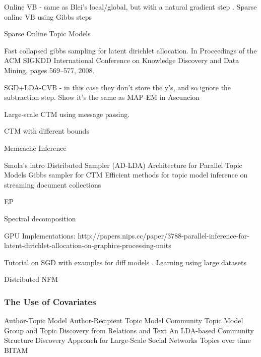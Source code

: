 \documentclass[10pt,fleqn]{article}
\begin{document}

Online VB - same as Blei's local/global, but with a natural gradient step \cite{Hoffman2010}. Sparse online VB using Gibbs steps\cite{Mimno2012a} 

Sparse Online Topic Models\cite{Zhang2013}

Fast collapsed gibbs sampling for latent dirichlet allocation. In Proceedings of the ACM SIGKDD International Conference on Knowledge Discovery and Data Mining, pages 569–577, 2008. 


SGD+LDA-CVB \cite{Boyles2013} - in this case they don't store the y's, and so ignore the subtraction step. Show it's the same as MAP-EM in Ascuncion


Large-scale CTM\cite{Ahmed2006} using message passing.

CTM with different bounds\cite{Wang2013}

Memcache Inference\cite{Ahmed}


Smola's intro \cite{SmolaWeb2012}
Distributed Sampler (AD-LDA)\cite{Newman2009}
Architecture for Parallel Topic Models\cite{Smola2010}
Gibbs sampler for CTM \cite{Chen2013}
Efficient methods for topic model inference on streaming document collections\cite{Yao2009}


EP \cite{Minka2002}

Spectral decomposition \cite{Anandkumar}

GPU Implementations: http://papers.nips.cc/paper/3788-parallel-inference-for-latent-dirichlet-allocation-on-graphics-processing-units

Tutorial on SGD with examples for diff models \cite{Bottou2004}. Learning using large datasets \cite{Bottou2008}

Distributed NFM\cite{Liu2010}



\subsubsection{The Use of Covariates}


Author-Topic Model\cite{RosenZvi2004}
Author-Recipient Topic Model\cite{MacCallum2007}
Community Topic Model\cite{Sachan2012}
Group and Topic Discovery from Relations and Text\cite{Wang2005}
An LDA-based Community Structure Discovery Approach for Large-Scale Social Networks\cite{Zhang2007}
Topics over time\cite{Wang2006}
BITAM\cite{Zhao2001}
\end{document}
